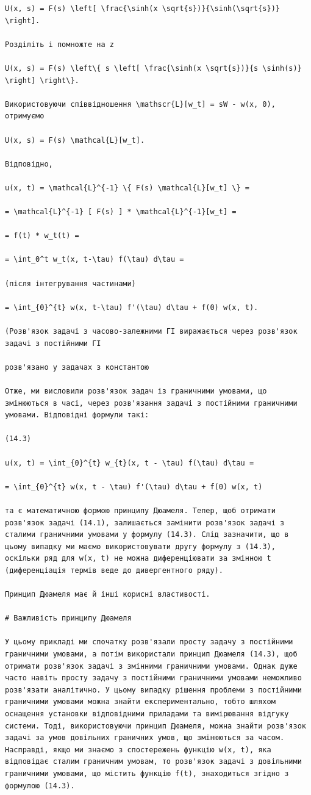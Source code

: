 \documentclass[
  ukrainian,
]{article}
\begin{document}
\begin{verbatim}
U(x, s) = F(s) \left[ \frac{\sinh(x \sqrt{s})}{\sinh(\sqrt{s})} \right].

Розділіть і помножте на z

U(x, s) = F(s) \left\{ s \left[ \frac{\sinh(x \sqrt{s})}{s \sinh(s)} \right] \right\}.

Використовуючи співвідношення \mathscr{L}[w_t] = sW - w(x, 0), отримуємо

U(x, s) = F(s) \mathcal{L}[w_t].

Відповідно,

u(x, t) = \mathcal{L}^{-1} \{ F(s) \mathcal{L}[w_t] \} =

= \mathcal{L}^{-1} [ F(s) ] * \mathcal{L}^{-1}[w_t] =

= f(t) * w_t(t) =

= \int_0^t w_t(x, t-\tau) f(\tau) d\tau =

(після інтегрування частинами)

= \int_{0}^{t} w(x, t-\tau) f'(\tau) d\tau + f(0) w(x, t).

(Розв'язок задачі з часово-залежними ГІ виражається через розв'язок задачі з постійними ГІ

розв'язано у задачах з константою

Отже, ми висловили розв'язок задач із граничними умовами, що змінюються в часі, через розв'язання задачі з постійними граничними умовами. Відповідні формули такі:

(14.3)

u(x, t) = \int_{0}^{t} w_{t}(x, t - \tau) f(\tau) d\tau =

= \int_{0}^{t} w(x, t - \tau) f'(\tau) d\tau + f(0) w(x, t)

та є математичною формою принципу Дюамеля. Тепер, щоб отримати розв'язок задачі (14.1), залишається замінити розв'язок задачі з сталими граничними умовами у формулу (14.3). Слід зазначити, що в цьому випадку ми маємо використовувати другу формулу з (14.3), оскільки ряд для w(x, t) не можна диференціювати за змінною t (диференціація термів веде до дивергентного ряду).

Принцип Дюамеля має й інші корисні властивості.

# Важливість принципу Дюамеля

У цьому прикладі ми спочатку розв'язали просту задачу з постійними граничними умовами, а потім використали принцип Дюамеля (14.3), щоб отримати розв'язок задачі з змінними граничними умовами. Однак дуже часто навіть просту задачу з постійними граничними умовами неможливо розв'язати аналітично. У цьому випадку рішення проблеми з постійними граничними умовами можна знайти експериментально, тобто шляхом оснащення установки відповідними приладами та вимірювання відгуку системи. Тоді, використовуючи принцип Дюамеля, можна знайти розв'язок задачі за умов довільних граничних умов, що змінюються за часом. Насправді, якщо ми знаємо з спостережень функцію w(x, t), яка відповідає сталим граничним умовам, то розв'язок задачі з довільними граничними умовами, що містить функцію f(t), знаходиться згідно з формулою (14.3).


\end{verbatim}
\end{document}
